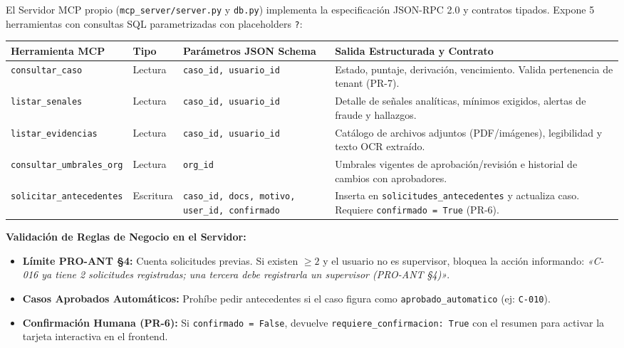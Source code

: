 \documentclass[11pt,letterpaper]{article}
\begin{document}
El Servidor MCP propio (\texttt{mcp\_server/server.py} y \texttt{db.py}) implementa la especificación JSON-RPC 2.0 y contratos tipados. Expone 5 herramientas con consultas SQL parametrizadas con placeholders \texttt{?}:
\begin{table}[h!]
\small\centering
\begin{tabularx}{\textwidth}{lP{2cm}P{3.5cm}Y}
\toprule
\textbf{Herramienta MCP} & \textbf{Tipo} & \textbf{Parámetros JSON Schema} & \textbf{Salida Estructurada y Contrato} \\
\midrule
\texttt{consultar\_caso} & Lectura & \texttt{caso\_id, usuario\_id} & Estado, puntaje, derivación, vencimiento. Valida pertenencia de tenant (PR-7). \\
\texttt{listar\_senales} & Lectura & \texttt{caso\_id, usuario\_id} & Detalle de señales analíticas, mínimos exigidos, alertas de fraude y hallazgos. \\
\texttt{listar\_evidencias} & Lectura & \texttt{caso\_id, usuario\_id} & Catálogo de archivos adjuntos (PDF/imágenes), legibilidad y texto OCR extraído. \\
\texttt{consultar\_umbrales\_org} & Lectura & \texttt{org\_id} & Umbrales vigentes de aprobación/revisión e historial de cambios con aprobadores. \\
\texttt{solicitar\_antecedentes} & Escritura & \texttt{caso\_id, docs, motivo, user\_id, confirmado} & Inserta en \texttt{solicitudes\_antecedentes} y actualiza caso. Requiere \texttt{confirmado = True} (PR-6). \\
\bottomrule
\end{tabularx}
\end{table}

\textbf{Validación de Reglas de Negocio en el Servidor:}
\begin{itemize}
    \item \textbf{Límite PRO-ANT §4:} Cuenta solicitudes previas. Si existen $\ge 2$ y el usuario no es supervisor, bloquea la acción informando: \textit{«C-016 ya tiene 2 solicitudes registradas; una tercera debe registrarla un supervisor (PRO-ANT §4)»}.
    \item \textbf{Casos Aprobados Automáticos:} Prohíbe pedir antecedentes si el caso figura como \texttt{aprobado\_automatico} (ej: \texttt{C-010}).
    \item \textbf{Confirmación Humana (PR-6):} Si \texttt{confirmado = False}, devuelve \texttt{requiere\_confirmacion: True} con el resumen para activar la tarjeta interactiva en el frontend.
\end{itemize}
\end{document}
